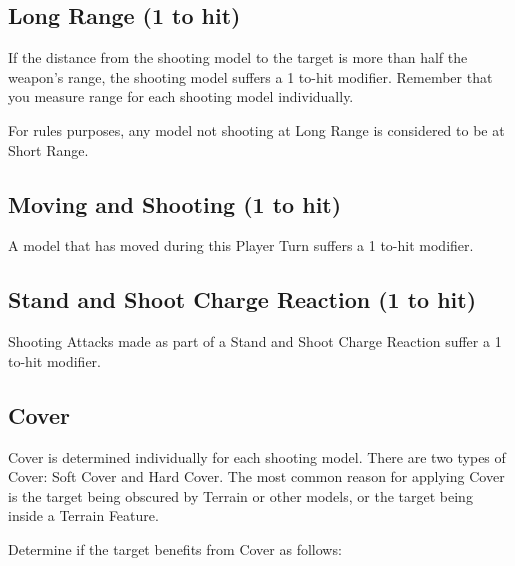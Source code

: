 \subsection{Long Range (\minuss{}1 to hit)}
\label{long_range}

If the distance from the shooting model to the target is more than half the weapon's range, the shooting model suffers a \minuss{}1 to-hit modifier. Remember that you measure range for each shooting model individually.

For rules purposes, any model not shooting at Long Range is considered to be at Short Range.

\subsection{Moving and Shooting (\minuss{}1 to hit)}
\label{moving_and_shooting}

A model that has moved during this Player Turn suffers a \minuss{}1 to-hit modifier.

\subsection{Stand and Shoot Charge Reaction (\minuss{}1 to hit)}
\label{stand_and_shoot_charge_reaction}

Shooting Attacks made as part of a Stand and Shoot Charge Reaction suffer a \minuss{}1 to-hit modifier.

\subsection{Cover}
\label{cover}\label{target_facing}

Cover is determined individually for each shooting model. There are two types of Cover: Soft Cover and Hard Cover. The most common reason for applying Cover is the target being obscured by Terrain or other models, or the target being inside a Terrain Feature.

\newpage
Determine if the target benefits from Cover as follows:

